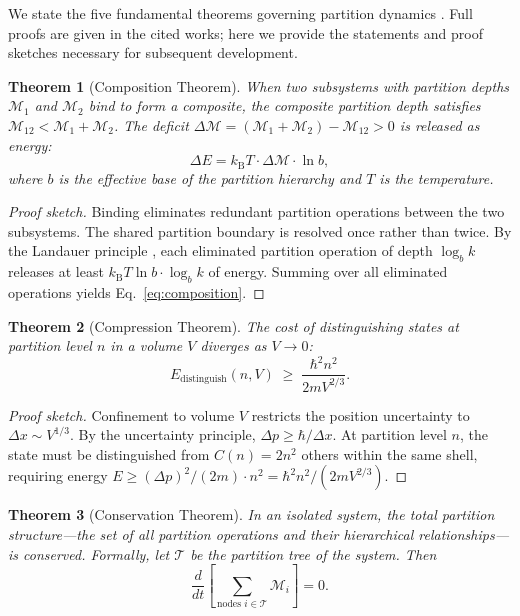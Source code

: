 \documentclass[11pt,twocolumn,a4paper]{article}
\theoremstyle{plain}
\newtheorem{theorem}{Theorem}[section]
\theoremstyle{definition}
\theoremstyle{remark}
\newcommand{\kB}{k_{\mathrm{B}}}
\newcommand{\Depth}{\mathcal{M}}
\begin{document}
We state the five fundamental theorems governing partition dynamics \cite{sachikonye2026single, sachikonye2026partition}. Full proofs are given in the cited works; here we provide the statements and proof sketches necessary for subsequent development.

\begin{theorem}[Composition Theorem]
\label{thm:composition}
When two subsystems with partition depths $\Depth_1$ and $\Depth_2$ bind to form a composite, the composite partition depth satisfies $\Depth_{12} < \Depth_1 + \Depth_2$. The deficit $\Delta \Depth = (\Depth_1 + \Depth_2) - \Depth_{12} > 0$ is released as energy:
\begin{equation}
\Delta E = \kB T \cdot \Delta \Depth \cdot \ln b,
\label{eq:composition}
\end{equation}
where $b$ is the effective base of the partition hierarchy and $T$ is the temperature.
\end{theorem}

\begin{proof}[Proof sketch]
Binding eliminates redundant partition operations between the two subsystems. The shared partition boundary is resolved once rather than twice. By the Landauer principle \cite{landauer1961irreversibility}, each eliminated partition operation of depth $\log_b k$ releases at least $\kB T \ln b \cdot \log_b k$ of energy. Summing over all eliminated operations yields Eq.~\eqref{eq:composition}.
\end{proof}

\begin{theorem}[Compression Theorem]
\label{thm:compression}
The cost of distinguishing states at partition level $n$ in a volume $V$ diverges as $V \to 0$:
\begin{equation}
E_{\mathrm{distinguish}}(n, V) \;\geq\; \frac{\hbar^2 n^2}{2m V^{2/3}}.
\label{eq:compression}
\end{equation}
\end{theorem}

\begin{proof}[Proof sketch]
Confinement to volume $V$ restricts the position uncertainty to $\Delta x \sim V^{1/3}$. By the uncertainty principle, $\Delta p \geq \hbar/\Delta x$. At partition level $n$, the state must be distinguished from $C(n) = 2n^2$ others within the same shell, requiring energy $E \geq (\Delta p)^2/(2m) \cdot n^2 = \hbar^2 n^2/(2m V^{2/3})$.
\end{proof}

\begin{theorem}[Conservation Theorem]
\label{thm:conservation}
In an isolated system, the total partition structure---the set of all partition operations and their hierarchical relationships---is conserved. Formally, let $\mathcal{T}$ be the partition tree of the system. Then
\begin{equation}
\frac{d}{dt}\left[\sum_{\text{nodes } i \in \mathcal{T}} \Depth_i\right] = 0.
\label{eq:conservation}
\end{equation}
\end{theorem}
\end{document}
